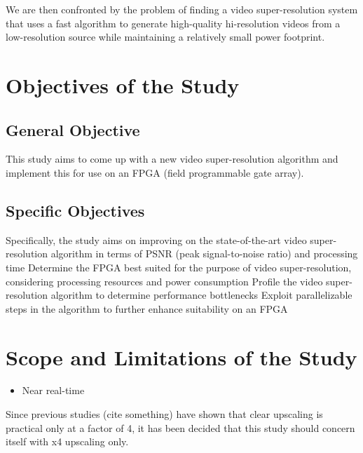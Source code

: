 We are then confronted by the problem of finding a video super-resolution system that uses
a fast algorithm to generate high-quality hi-resolution videos from a low-resolution source 
while maintaining a relatively small power footprint.



\section{Objectives of the Study}

\subsection{General Objective}

This study aims to come up with a new video super-resolution algorithm and implement this for use on an FPGA (field programmable gate array).


\subsection{Specific Objectives}

Specifically, the study aims on improving on the state-of-the-art video super-resolution algorithm in terms of PSNR (peak signal-to-noise ratio) and processing time
Determine the FPGA best suited for the purpose of video super-resolution, considering processing resources and power consumption
Profile the video super-resolution algorithm to determine performance bottlenecks
Exploit parallelizable steps in the algorithm to further enhance suitability on an FPGA



\section{Scope and Limitations of the Study}

\begin{itemize}
\item Near real-time 
\end{itemize}

Since previous studies (cite something) have shown that clear upscaling is practical only at a factor of 4, 
it has been decided that this study should concern itself with x4 upscaling only.


